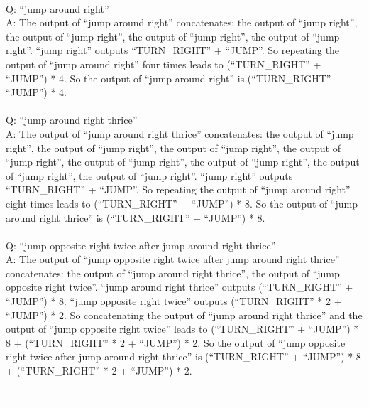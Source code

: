 {\\
Q: ``jump around right'' \\
A: The output of ``jump around right'' concatenates: the output of ``jump right'', the output of ``jump right'', the output of ``jump right'', the output of ``jump right''. ``jump right'' outputs ``TURN\_RIGHT'' + ``JUMP''. So repeating the output of ``jump around right'' four times leads to (``TURN\_RIGHT'' + ``JUMP'') * 4. So the output of ``jump around right'' is (``TURN\_RIGHT'' + ``JUMP'') * 4. \\
\\
Q: ``jump around right thrice'' \\
A: The output of ``jump around right thrice'' concatenates: the output of ``jump right'', the output of ``jump right'', the output of ``jump right'', the output of ``jump right'', the output of ``jump right'', the output of ``jump right'', the output of ``jump right'', the output of ``jump right''. ``jump right'' outputs ``TURN\_RIGHT'' + ``JUMP''. So repeating the output of ``jump around right'' eight times leads to (``TURN\_RIGHT'' + ``JUMP'') * 8. So the output of ``jump around right thrice'' is (``TURN\_RIGHT'' + ``JUMP'') * 8. \\
\\
Q: ``jump opposite right twice after jump around right thrice'' \\
A: The output of ``jump opposite right twice after jump around right thrice'' concatenates: the output of ``jump around right thrice'', the output of ``jump opposite right twice''. ``jump around right thrice'' outputs (``TURN\_RIGHT'' + ``JUMP'') * 8. ``jump opposite right twice'' outputs (``TURN\_RIGHT'' * 2 + ``JUMP'') * 2. So concatenating the output of ``jump around right thrice'' and the output of ``jump opposite right twice'' leads to (``TURN\_RIGHT'' + ``JUMP'') * 8 + (``TURN\_RIGHT'' * 2 + ``JUMP'') * 2. So the output of ``jump opposite right twice after jump around right thrice'' is (``TURN\_RIGHT'' + ``JUMP'') * 8 + (``TURN\_RIGHT'' * 2 + ``JUMP'') * 2. \\
\\
\hrule \bigskip
}

